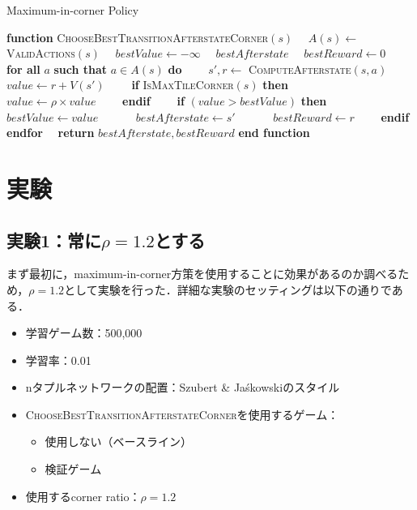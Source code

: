\documentclass{suribt}
\begin{document}
\begin{algorithm}[t]
\caption{Maximum-in-corner Policy}
\label{alg3}
\begin{algorithmic}[1]
\STATE \textbf{function} \textsc{ChooseBestTransitionAfterstateCorner}$(s)$
\STATE 　$A(s) \leftarrow$ \textsc{ValidActions}$(s)$
\STATE 　$bestValue \leftarrow -\infty$
\STATE 　$bestAfterstate$ 
\STATE 　$bestReward \leftarrow 0$
\STATE 　\textbf{for all} $a$ \textbf{such that} $a \in A(s)$ \textbf{do}
\STATE 　　$s', r \leftarrow$ \textsc{ComputeAfterstate}$(s,a)$
\STATE 　　$value \leftarrow r + V(s')$
\STATE 　　\textbf{if} \textsc{IsMaxTileCorner}$(s)$ \textbf{then}
\STATE 　　　$value \leftarrow {\rho} \times value$
\STATE 　　\textbf{endif}
\STATE 　　\textbf{if} $(value > bestValue)$ \textbf{then}
\STATE 　　　$bestValue \leftarrow value$
\STATE 　　　$bestAfterstate \leftarrow s'$
\STATE 　　　$bestReward \leftarrow r$
\STATE 　　\textbf{endif}
\STATE 　\textbf{endfor}
\STATE 　\textbf{return} $bestAfterstate, bestReward$
\STATE \textbf{end function}
\end{algorithmic}
\end{algorithm}



\chapter{実験}
\section{実験1：常に${\rho}=1.2$とする}
まず最初に，maximum-in-corner方策を使用することに効果があるのか調べるため，${\rho}=1.2$として実験を行った．詳細な実験のセッティングは以下の通りである．

\begin{itemize}
\item 学習ゲーム数：500,000
\item 学習率：0.01
\item nタプルネットワークの配置：Szubert \& Ja\'{s}kowskiのスタイル
\item \textsc{ChooseBestTransitionAfterstateCorner}を使用するゲーム：
\begin{itemize}
\item 使用しない（ベースライン）
\item 検証ゲーム
\end{itemize}
\item 使用するcorner ratio：${\rho}=1.2$
\end{itemize}
\end{document}
